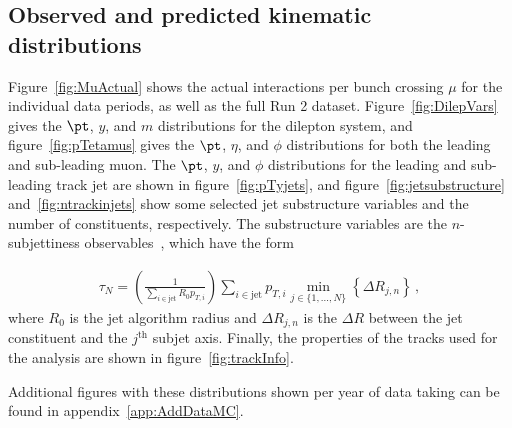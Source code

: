 \subsection{Observed and predicted kinematic distributions}
\label{sec:datamc}
Figure~\ref{fig:MuActual} shows the actual interactions per bunch crossing $\mu$ for the individual data periods, as well as the full Run 2 dataset.
Figure~\ref{fig:DilepVars} gives the $\pt$, $y$, and $m$ distributions for the dilepton system, and figure~\ref{fig:pTetamus} gives the $\pt$, $\eta$, and $\phi$ distributions for both the leading and sub-leading muon.
The $\pt$, $y$, and $\phi$ distributions for the leading and sub-leading track jet are shown in figure~\ref{fig:pTyjets}, and figure~\ref{fig:jetsubstructure} and~\ref{fig:ntrackinjets} show some
selected jet substructure variables and the number of constituents, respectively.  The substructure variables are the $n$-subjettiness observables~\cite{Thaler:2010tr,Thaler:2011gf}, which have the form

\begin{align}
\tau_N=\left(\frac{1}{\sum_{i\in\text{jet}} R_0p_{T,i}}\right)\sum_{i\in\text{jet}} p_{T,i}\min_{j\in\{1,...,N\}}\left\{\Delta R_{j,n}\right\}\,,
\end{align}
%
where $R_0$ is the jet algorithm radius and $\Delta R_{j,n}$ is the $\Delta R$ between the jet constituent and the $j^\text{th}$ subjet axis. Finally, the properties of the tracks used for the analysis are shown in figure~\ref{fig:trackInfo}.

Additional figures with these distributions shown per year of data taking can be found in appendix~\ref{app:AddDataMC}.

